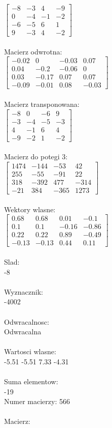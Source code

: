 \documentclass[a4paper,12pt]{article}
\begin{document}
$\begin{bmatrix} -8&-3&4&-9\\0&-4&-1&-2\\-6&-5&6&1\\9&-3&4&-2 \end{bmatrix}$
\\
\\
Macierz odwrotna:\\

$\begin{bmatrix} -0.02&0&-0.03&0.07\\0.04&-0.2&-0.06&0\\0.03&-0.17&0.07&0.07\\-0.09&-0.01&0.08&-0.03 \end{bmatrix}$
\\
\\
Macierz transponowana:\\

$\begin{bmatrix} -8&0&-6&9\\-3&-4&-5&-3\\4&-1&6&4\\-9&-2&1&-2 \end{bmatrix}$
\\
\\
Macierz do potegi 3:\\

$\begin{bmatrix} 1474&-144&-53&42\\255&-55&-91&22\\318&-392&477&-314\\-21&384&-365&1273 \end{bmatrix}$
\\
\\
Wektory wlasne:\\

$\begin{bmatrix} 0.68&0.68&0.01&-0.1\\0.1&0.1&-0.16&-0.86\\0.22&0.22&0.89&-0.49\\-0.13&-0.13&0.44&0.11 \end{bmatrix}$
\\
\\
Slad:\\
-8
\\
\\
Wyznacznik:\\
-4002
\\
\\
Odwracalnosc:\\
Odwracalna
\\
\\
Wartosci wlasne:\\
-5.51 -5.51 7.33 -4.31
\\
\\
Suma elementow:\\
-19
\\
\newpage
Numer macierzy:
566
\\
\\
Macierz:\\
\end{document}
